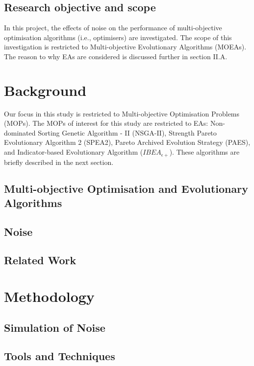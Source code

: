 \documentclass[conference,a4paper]{IEEEtran}
\begin{document}
\subsection{Research objective and scope}\label{sec: oneA}
In this project, the effects of noise on the performance of multi-objective optimisation algorithms (i.e., optimisers) are investigated. The scope of this investigation is restricted to Multi-objective Evolutionary Algorithms (MOEAs). The reason to why EAs are considered is discussed further in section II.A. 

\section{Background}\label{sec: two}
Our focus in this study is restricted to Multi-objective Optimisation Problems (MOPs). 
The MOPs of interest for this study are restricted to EAs: Non-dominated Sorting Genetic Algorithm - II (NSGA-II), Strength Pareto Evolutionary Algorithm 2 (SPEA2), Pareto Archived Evolution Strategy (PAES), and Indicator-based Evolutionary Algorithm ($IBEA_{\epsilon+}$). These algorithms are briefly described in the next section.

\subsection{Multi-objective Optimisation and Evolutionary Algorithms}\label{sec:twoA}

\subsection{Noise}\label{sec:twoB}

\subsection{Related Work}\label{sec: twoC}

\section{Methodology}\label{sec: three}

\subsection{Simulation of Noise}\label{sec: threeA}

\subsection{Tools and Techniques}\label{sec: threeB}
\end{document}
